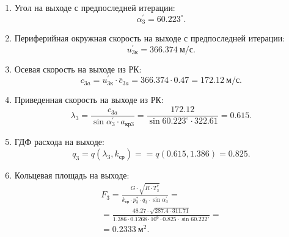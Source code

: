 \documentclass[a4paper,12pt]{article}
\begin{document}
\begin{enumerate}
\begin{enumerate}
            \item Угол на выходе с предпоследней итерации:
            \[
                \alpha_3^\prime = 60.223^\circ.
            \]

            \item Периферийная окружная скорость на выходе с предпоследней итерации:
            \[
                u_{3к}^\prime = 366.374\ м/с.
            \] 

            \item Осевая скорость на выходе из РК:
            \[
                c_{3a} = u_{3к}^\prime \cdot \bar{c}_{3a} = 
                366.374 \cdot 0.47 = 
                172.12\ м/с.
            \]

            \item Приведенная скорость на выходе из РК:
            \[
                \lambda_3 = \frac{ c_{3a} }{ \sin{\alpha_3^\prime} \cdot a_{кр3} } = 
                \frac{ 172.12 
                }{ 
                    \sin{60.223^\circ} \cdot 322.61 } =
                0.615. 
            \]

            \item ГДФ расхода на выходе:
            \[
                q_3 = q(\lambda_3, k_{ср}) = = q(0.615, 1.386) = 
                0.825.
            \]

            \item Кольцевая площадь на выходе:
            \begin{gather*}
                F_3 = \frac{ G \cdot \sqrt{R \cdot T_3^*} }{ k_{ср} \cdot p_3^* \cdot q_3 \cdot \sin{\alpha_3^\prime} } =\\ 
                =\frac{ 
                    48.27 \cdot \sqrt{ 287.4 \cdot 311.71}
                }{ 
                    1.386 \cdot 0.1268 \cdot 10^6 \cdot 0.825 
                    \cdot \sin{60.222^\circ} 
                } =\\ 
                =0.2333\ м^2.\\
            \end{gather*}


\end{enumerate}
\end{enumerate}
\end{document}
